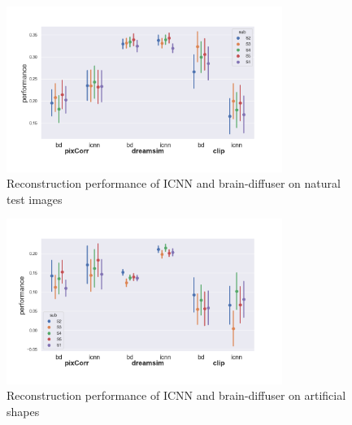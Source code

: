 \begin{figure}[ht]
    \centering
    \includegraphics[width=0.8\textwidth]{plots/baseline_reconstruction_test.png}
    \caption{Reconstruction performance of ICNN and brain-diffuser on natural test images}\label{fig:baselinerecontestquant}
\end{figure}

\begin{figure}[ht]
    \centering
    \includegraphics[width=0.8\textwidth]{plots/baseline_reconstruction_art.png}
    \caption{Reconstruction performance of ICNN and brain-diffuser on artificial shapes}\label{fig:baselinereconartquan}
\end{figure}

% 

